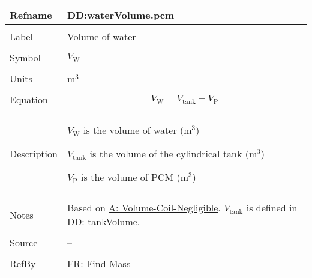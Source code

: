 \documentclass[12pt]{article}
\begin{document}
\vspace{\baselineskip}
\noindent
\begin{minipage}{\textwidth}
\begin{tabular}{>{\raggedright}p{}>{\raggedright\arraybackslash}p{}}
\toprule \textbf{Refname} & \textbf{DD:waterVolume.pcm}
\label{DD:waterVolume.pcm}
\\ \midrule \\
Label & Volume of water
        
\\ \midrule \\
Symbol & ${V_{\text{W}}}$
         
\\ \midrule \\
Units & ${\text{m}^{3}}$
        
\\ \midrule \\
Equation & \begin{displaymath}
           {V_{\text{W}}}={V_{\text{tank}}}-{V_{\text{P}}}
           \end{displaymath}
\\ \midrule \\
Description & \begin{symbDescription}
              \item{${V_{\text{W}}}$ is the volume of water (${\text{m}^{3}}$)}
              \item{${V_{\text{tank}}}$ is the volume of the cylindrical tank (${\text{m}^{3}}$)}
              \item{${V_{\text{P}}}$ is the volume of PCM (${\text{m}^{3}}$)}
              \end{symbDescription}
\\ \midrule \\
Notes & Based on \hyperref[assumpVCN]{A: Volume-Coil-Negligible}. ${V_{\text{tank}}}$ is defined in \hyperref[DD:tankVolume]{DD: tankVolume}.
        
\\ \midrule \\
Source & --
         
\\ \midrule \\
RefBy & \hyperref[findMass]{FR: Find-Mass}
        
\\ \bottomrule
\end{tabular}
\end{minipage}
\end{document}

